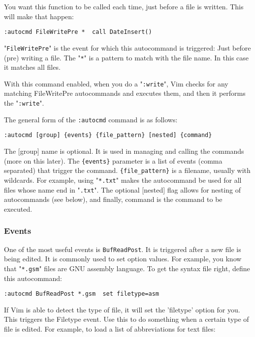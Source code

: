 {You want this function to be called each time, just before a file is written.
This will make that happen:

\begin{Verbatim}[samepage=true]
 :autocmd FileWritePre *  call DateInsert()
\end{Verbatim}

"\verb!FileWritePre!" is the event for which this autocommand is triggered: Just before (pre) writing a file.
The "\verb!*!" is a pattern to match with the file name.
In this case it matches all files.

With this command enabled, when you do a "\verb!:write!", Vim checks for any matching FileWritePre autocommands and executes them, and then it performs the "\verb!:write!".

The general form of the \verb!:autocmd! command is as follows:

\begin{Verbatim}[samepage=true]
 :autocmd [group] {events} {file_pattern} [nested] {command}
\end{Verbatim}

The [group] name is optional.
It is used in managing and calling the commands (more on this later).
The \verb!{events}! parameter is a list of events (comma separated) that trigger the command.
\verb!{file_pattern}! is a filename, usually with wildcards.
For example, using "\verb!*.txt!" makes the autocommand be used for all files whose name end in "\verb!.txt!".
The optional [nested] flag allows for nesting of autocommands (see below), and finally, {command} is the command to be executed.

\subsubsection{Events}
One of the most useful events is \verb!BufReadPost!.
It is triggered after a new file is being edited.
It is commonly used to set option values.
For example, you know that "\verb!*.gsm!" files are GNU assembly language.
To get the syntax file right, define this autocommand:

\begin{Verbatim}[samepage=true]
 :autocmd BufReadPost *.gsm  set filetype=asm
\end{Verbatim}

If Vim is able to detect the type of file, it will set the 'filetype' option for you.
This triggers the Filetype event.
Use this to do something when a certain type of file is edited.
For example, to load a list of abbreviations for text files:

}
